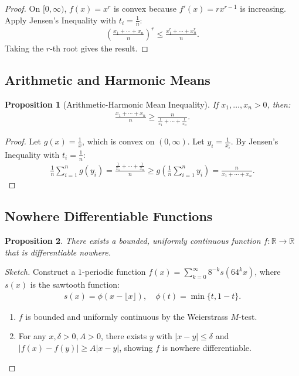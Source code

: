\documentclass[9pt]{article}
\theoremstyle{definition}
\theoremstyle{plain}
\newtheorem{proposition}{Proposition}
\begin{document}
\begin{proof}
On $ [0, \infty) $, $ f(x) = x^r $ is convex because $ f'(x) = rx^{r-1} $ is increasing. Apply Jensen’s Inequality with $ t_i = \frac{1}{n} $:
\begin{align}
\left(\frac{x_1 + \cdots + x_n}{n}\right)^r \leq \frac{x_1^r + \cdots + x_n^r}{n}.
\end{align}
Taking the $ r $-th root gives the result.
\end{proof}

\subsection*{Arithmetic and Harmonic Means}
\begin{proposition}[Arithmetic-Harmonic Mean Inequality]
If $ x_1, \ldots, x_n > 0 $, then:
\begin{align}
\frac{x_1 + \cdots + x_n}{n} \geq \frac{n}{\frac{1}{x_1} + \cdots + \frac{1}{x_n}}.
\end{align}
\end{proposition}

\begin{proof}
Let $ g(x) = \frac{1}{x} $, which is convex on $ (0, \infty) $. Let $ y_i = \frac{1}{x_i} $. By Jensen’s Inequality with $ t_i = \frac{1}{n} $:
\begin{align}
\frac{1}{n} \sum_{i=1}^n g(y_i) = \frac{\frac{1}{x_1} + \cdots + \frac{1}{x_n}}{n} \geq g\left(\frac{1}{n} \sum_{i=1}^n y_i\right) = \frac{n}{x_1 + \cdots + x_n}.
\end{align}
\end{proof}

\subsection*{Nowhere Differentiable Functions}
\begin{proposition}
There exists a bounded, uniformly continuous function $ f : \mathbb{R} \to \mathbb{R} $ that is differentiable nowhere.
\end{proposition}

\begin{proof}[Sketch]
Construct a $ 1 $-periodic function $ f(x) = \sum_{k=0}^\infty 8^{-k}s(64^k x) $, where $ s(x) $ is the sawtooth function:
\begin{align}
s(x) = \phi(x - \lfloor x \rfloor), \quad \phi(t) = \min\{t, 1-t\}.
\end{align}
\begin{enumerate}
    \item $ f $ is bounded and uniformly continuous by the Weierstrass $ M $-test.
    \item For any $ x, \delta > 0, A > 0 $, there exists $ y $ with $ |x - y| \leq \delta $ and $ |f(x) - f(y)| \geq A|x - y| $, showing $ f $ is nowhere differentiable.
\end{enumerate}
\end{proof}
\end{document}
